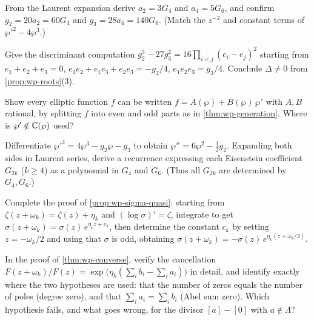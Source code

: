\begin{exercise}
\label{ex:wp-g2g3}
From the Laurent expansion derive \(a_2 = 3G_4\) and \(a_4 = 5G_6\), and confirm
\(g_2 = 20a_2 = 60G_4\) and \(g_3 = 28a_4 = 140G_6\). (Match the
\(z^{-2}\) and constant terms of \(\wp'^2 - 4\wp^3\).)
\end{exercise}

\begin{exercise}
\label{ex:wp-roots-distinct}
Give the discriminant computation \(g_2^3 - 27g_3^2 = 16\prod_{i<j}(e_i-e_j)^2\)
starting from \(e_1+e_2+e_3 = 0\), \(e_1e_2+e_1e_3+e_2e_3 = -g_2/4\),
\(e_1e_2e_3 = g_3/4\). Conclude \(\Delta \ne 0\) from
\cref{prop:wp-roots}(3).
\end{exercise}

\begin{exercise}
\label{ex:wp-field}
Show every elliptic function \(f\) can be written \(f = A(\wp) + B(\wp)\,\wp'\)
with \(A, B\) rational, by splitting \(f\) into even and odd parts as in
\cref{thm:wp-generation}. Where is \(\wp' \notin \mathbb{C}(\wp)\) used?
\end{exercise}

\begin{exercise}
\label{ex:wp-recurrence}
Differentiate \(\wp'^2 = 4\wp^3 - g_2\wp - g_3\) to obtain
\(\wp'' = 6\wp^2 - \tfrac12 g_2\). Expanding both sides in Laurent series, derive
a recurrence expressing each Eisenstein coefficient \(G_{2k}\) (\(k \ge 4\)) as a
polynomial in \(G_4\) and \(G_6\). (Thus all \(G_{2k}\) are determined by
\(G_4, G_6\).)
\end{exercise}

\begin{exercise}
\label{ex:wp-sigma-quasi}
Complete the proof of \cref{prop:wp-sigma-quasi}: starting from \(\zeta(z+\omega_k)
= \zeta(z) + \eta_k\) and \((\log\sigma)' = \zeta\), integrate to get
\(\sigma(z+\omega_k) = \sigma(z)\,e^{\eta_k z + c_k}\), then determine the constant
\(c_k\) by setting \(z = -\omega_k/2\) and using that \(\sigma\) is odd, obtaining
\(\sigma(z+\omega_k) = -\sigma(z)\,e^{\eta_k(z + \omega_k/2)}\).
\end{exercise}

\begin{exercise}
\label{ex:wp-converse-check}
In the proof of \cref{thm:wp-converse}, verify the cancellation
\(F(z+\omega_k)/F(z) = \exp\!\bigl(\eta_k(\sum_i b_i - \sum_i a_i)\bigr)\) in
detail, and identify exactly where the two hypotheses are used: that the number of
zeros equals the number of poles (degree zero), and that \(\sum_i a_i = \sum_i b_i\)
(Abel sum zero). Which hypothesis fails, and what goes wrong, for the divisor
\([a] - [0]\) with \(a \notin \Lambda\)?
\end{exercise}
